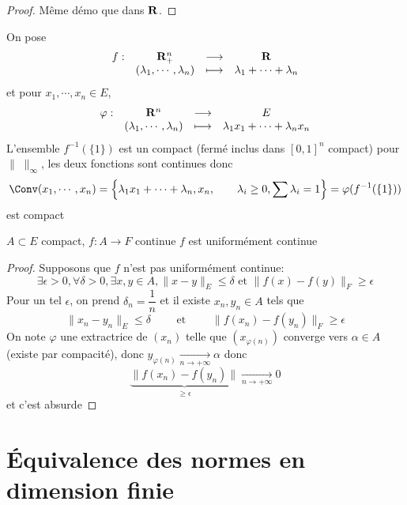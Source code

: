  \begin{proof}
 Même démo que dans $\mathbf R$.
 \end{proof}

 \begin{ex}
     On pose
     \[
        \begin{matrix}
            f:& \mathbf R_+^n & \longrightarrow & \mathbf R \\
              & (\lambda_1,\cdots ,\lambda_n) & \longmapsto & \lambda_1+\cdots +\lambda_n
        \end{matrix}
     \] 
     et pour $x_1, \cdots , x_n \in  E$, \[
     \begin{matrix}
         \varphi:& \mathbf R^n & \longrightarrow & E \\
                 & (\lambda_1,\cdots ,\lambda_n) & \longmapsto & \lambda_1 x_1+\cdots +\lambda_n x_n
     \end{matrix}
     \] 
     L'ensemble $f^{-1}(\{1\} )$ est un compact (fermé inclus dans $[0,1]^n$ compact) pour $\|\;\|_\infty$, les deux fonctions sont continues donc \[
         \Conv(x_1, \cdots , x_n)= \left\{ \lambda_1x_1+\cdots +\lambda_n,x_n,\qquad \lambda_i\geq 0, \sum\lambda_i=1 \right\}=\varphi(f^{-1}(\{1\} ))
     \] 
     est compact
\end{ex}

\begin{thm}
\Hyp $A\subset E$ compact,  $f:A\to F$ continue
\Conc $f$ est uniformément continue
\end{thm}

\begin{proof}
Supposons que $f$ n'est pas uniformément continue: \[
    \exists   \epsilon>0,\forall  \delta>0,\exists x,y \in  A, \|x-y\|_E \leq \delta \text{ et } \|f(x)-f(y)\|_F\geq \epsilon
\] 
Pour un tel $\epsilon$, on prend $\delta_n=\dfrac{1}{n}$ et il existe $x_n,y_n \in  A$ tels que \[
\|x_n-y_n\|_E \leq \delta \qquad  \text{ et } \qquad  \|f(x_n)-f(y_n)\|_F\geq \epsilon
\] 
On note $\varphi$ une extractrice de  $(x_n)$ telle que  $(x_{\varphi(n)})$ converge vers $\alpha \in  A$ (existe par compacité), donc \linebreak $y_{\varphi(n)}\xrightarrow[n\to+\infty]{}\alpha$ donc \[
\underbrace{\|f(x_n)-f(y_n)\|}_{\displaystyle \geq \epsilon} \xrightarrow[n\to+\infty]{}0
\] 
et c'est absurde
\end{proof}

\section{Équivalence des normes en dimension finie}

